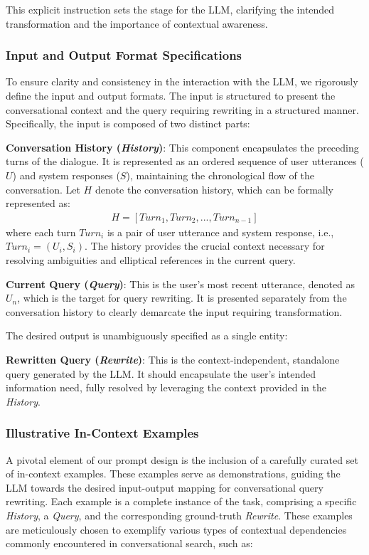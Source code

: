 This explicit instruction sets the stage for the LLM, clarifying the intended transformation and the importance of contextual awareness.

\subsubsection{Input and Output Format Specifications}

To ensure clarity and consistency in the interaction with the LLM, we rigorously define the input and output formats.  The input is structured to present the conversational context and the query requiring rewriting in a structured manner.  Specifically, the input is composed of two distinct parts:

\textbf{Conversation History (\textit{History})}:  This component encapsulates the preceding turns of the dialogue.  It is represented as an ordered sequence of user utterances (\(U\)) and system responses (\(S\)), maintaining the chronological flow of the conversation. Let \(H\) denote the conversation history, which can be formally represented as:
\begin{align}
H = [Turn_1, Turn_2, ..., Turn_{n-1}]
\end{align}
where each turn \(Turn_i\) is a pair of user utterance and system response, i.e., \(Turn_i = (U_i, S_i)\).  The history provides the crucial context necessary for resolving ambiguities and elliptical references in the current query.

\textbf{Current Query (\textit{Query})}: This is the user's most recent utterance, denoted as \(U_n\), which is the target for query rewriting.  It is presented separately from the conversation history to clearly demarcate the input requiring transformation.

The desired output is unambiguously specified as a single entity:

\textbf{Rewritten Query (\textit{Rewrite})}: This is the context-independent, standalone query generated by the LLM.  It should encapsulate the user's intended information need, fully resolved by leveraging the context provided in the \textit{History}.

\subsubsection{Illustrative In-Context Examples}

A pivotal element of our prompt design is the inclusion of a carefully curated set of in-context examples. These examples serve as demonstrations, guiding the LLM towards the desired input-output mapping for conversational query rewriting.  Each example is a complete instance of the task, comprising a specific \textit{History}, a \textit{Query}, and the corresponding ground-truth \textit{Rewrite}.  These examples are meticulously chosen to exemplify various types of contextual dependencies commonly encountered in conversational search, such as:


